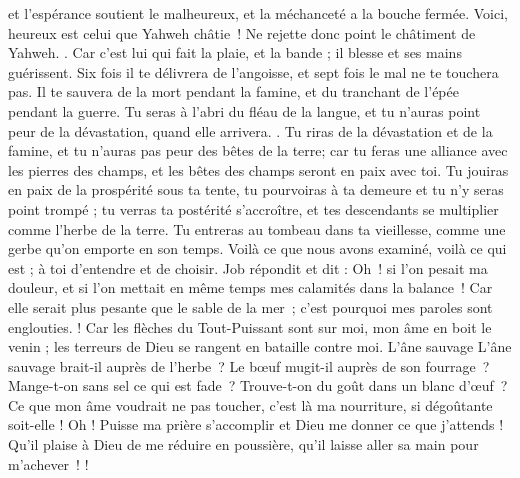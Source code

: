 \begin{multicols}{2}
et l'espérance soutient le malheureux, et la méchanceté a la bouche fermée.
Voici, heureux est celui que Yahweh châtie ! Ne rejette donc point le châtiment de Yahweh.
.
Car c'est lui qui fait la plaie, et la bande ; il blesse et ses mains guérissent.
Six fois il te délivrera de l'angoisse, et sept fois le mal ne te touchera pas.
Il te sauvera de la mort pendant la famine, et du tranchant de l'épée pendant la guerre.
Tu seras à l'abri du fléau de la langue, et tu n’auras point peur de la dévastation, quand elle arrivera.
.
Tu riras de la dévastation et de la famine, et tu n'auras pas peur des bêtes de la terre;
car tu feras une alliance avec les pierres des champs, et les bêtes des champs seront en paix avec toi.
Tu jouiras en paix de la prospérité sous ta tente, tu pourvoiras à ta demeure et tu n'y seras point trompé ;
tu verras ta postérité s'accroître, et tes descendants se multiplier comme l'herbe de la terre.
Tu entreras au tombeau dans ta vieillesse, comme une gerbe qu'on emporte en son temps.
Voilà ce que nous avons examiné, voilà ce qui est ; à toi d'entendre et de choisir.
\VerseOne{}Job répondit et dit :
Oh ! si l’on pesait ma douleur, et si l’on mettait en même temps mes calamités dans la balance !
Car elle serait plus pesante que le sable de la mer ; c’est pourquoi mes paroles sont englouties.
 !
Car les flèches du Tout-Puissant sont sur moi, mon âme en boit le venin ; les terreurs de Dieu se rangent en bataille contre moi.
L'âne sauvage L’âne sauvage brait-il auprès de l’herbe ? Le bœuf mugit-il auprès de son fourrage ?
Mange-t-on sans sel ce qui est fade ? Trouve-t-on du goût dans un blanc d’œuf ?
Ce que mon âme voudrait ne pas toucher, c'est là ma nourriture, si dégoûtante soit-elle !
Oh ! Puisse ma prière s'accomplir et Dieu me donner ce que j'attends !
Qu’il plaise à Dieu de me réduire en poussière, qu’il laisse aller sa main pour m’achever !
!

\end{multicols}
